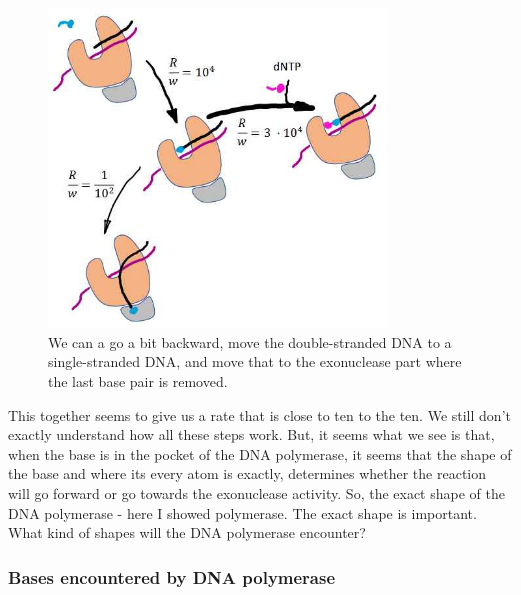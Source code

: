 \documentclass[]{article}
\begin{document}
\begin{figure}[H]
	\caption[Going backward a bit]{We can a go a bit backward, move the double-stranded DNA to a single-stranded DNA, and move that to the exonuclease part where the last base pair is removed.}\label{fig:WhatDNApolymeraseDoes}
	\includegraphics[width=0.8\textwidth]{WhatDNApolymeraseDoes}
\end{figure} 


This together seems to give us a rate
that is close to ten to the ten.
We still don't exactly understand
how all these steps work.
But, it seems what we see is that,
when the base is in the pocket
of the DNA polymerase,
it seems that the shape of the base
and where its every atom is exactly,
determines whether the reaction
will go forward
or go towards the exonuclease activity.
So, the exact shape
of the DNA polymerase -
here I showed  polymerase.
The exact shape is important.
What kind of shapes
will the DNA polymerase encounter?


\subsubsection{Bases encountered by DNA polymerase}
	
\end{document}
